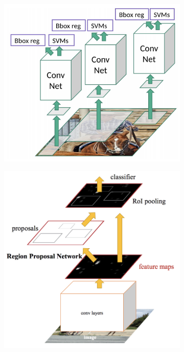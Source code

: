 \begin{figure}
    \centering
    \begin{subfigure}[b]{0.48\textwidth}
         \centering
         \includegraphics[width=\textwidth]{images/rcnn.png}
         \caption{}
         \label{fig:rcnn}
     \end{subfigure}
     \hfill
    \begin{subfigure}[b]{0.48\textwidth}
         \centering
         \includegraphics[width=\textwidth]{images/ffrcnn.png}

\end{subfigure}
\end{figure}
